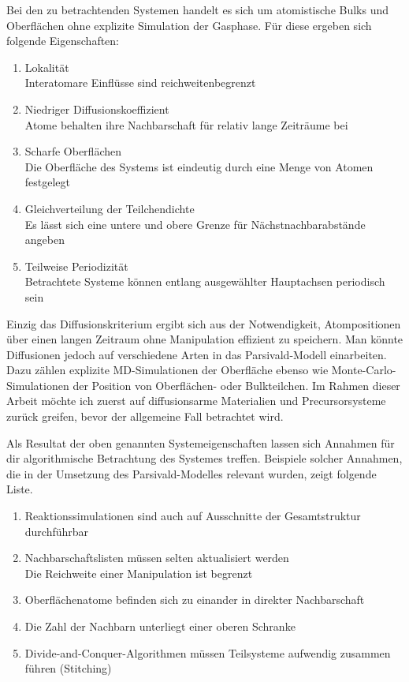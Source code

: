 Bei den zu betrachtenden Systemen handelt es sich um atomistische Bulks und Oberflächen ohne explizite Simulation der Gasphase.
Für diese ergeben sich folgende Eigenschaften:
\begin{enumerate}
\item Lokalität\\
  Interatomare Einflüsse sind reichweitenbegrenzt
\item Niedriger Diffusionskoeffizient\\
  Atome behalten ihre Nachbarschaft für relativ lange Zeiträume bei
\item Scharfe Oberflächen\\
  Die Oberfläche des Systems ist eindeutig durch eine Menge von Atomen festgelegt
\item Gleichverteilung der Teilchendichte\\
  Es lässt sich eine untere und obere Grenze für Nächstnachbarabstände angeben
\item Teilweise Periodizität\\
  Betrachtete Systeme können entlang ausgewählter Hauptachsen periodisch sein
\end{enumerate}

Einzig das Diffusionskriterium ergibt sich aus der Notwendigkeit, Atompositionen über einen langen Zeitraum ohne Manipulation effizient zu speichern.
Man könnte Diffusionen jedoch auf verschiedene Arten in das Parsivald-Modell einarbeiten.
Dazu zählen explizite MD-Simulationen der Oberfläche ebenso wie Monte-Carlo-Simulationen der Position von Oberflächen- oder Bulkteilchen.
Im Rahmen dieser Arbeit möchte ich zuerst auf diffusionsarme Materialien und Precursorsysteme zurück greifen, bevor der allgemeine Fall betrachtet wird.

Als Resultat der oben genannten Systemeigenschaften lassen sich Annahmen für dir algorithmische Betrachtung des Systemes treffen.
Beispiele solcher Annahmen, die in der Umsetzung des Parsivald-Modelles relevant wurden, zeigt folgende Liste.

\begin{enumerate}
\item Reaktionssimulationen sind auch auf Ausschnitte der Gesamtstruktur durchführbar
\item Nachbarschaftslisten müssen selten aktualisiert werden\\
  Die Reichweite einer Manipulation ist begrenzt
\item Oberflächenatome befinden sich zu einander in direkter Nachbarschaft
\item Die Zahl der Nachbarn unterliegt einer oberen Schranke
\item Divide-and-Conquer-Algorithmen müssen Teilsysteme aufwendig zusammen führen (Stitching)
\end{enumerate}

